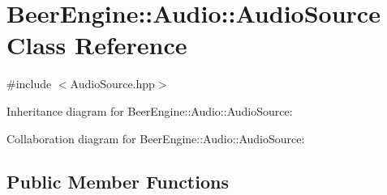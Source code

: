 \hypertarget{class_beer_engine_1_1_audio_1_1_audio_source}{}\section{Beer\+Engine\+:\+:Audio\+:\+:Audio\+Source Class Reference}
\label{class_beer_engine_1_1_audio_1_1_audio_source}


{\ttfamily \#include $<$Audio\+Source.\+hpp$>$}



Inheritance diagram for Beer\+Engine\+:\+:Audio\+:\+:Audio\+Source\+:


Collaboration diagram for Beer\+Engine\+:\+:Audio\+:\+:Audio\+Source\+:
\subsection*{Public Member Functions}
